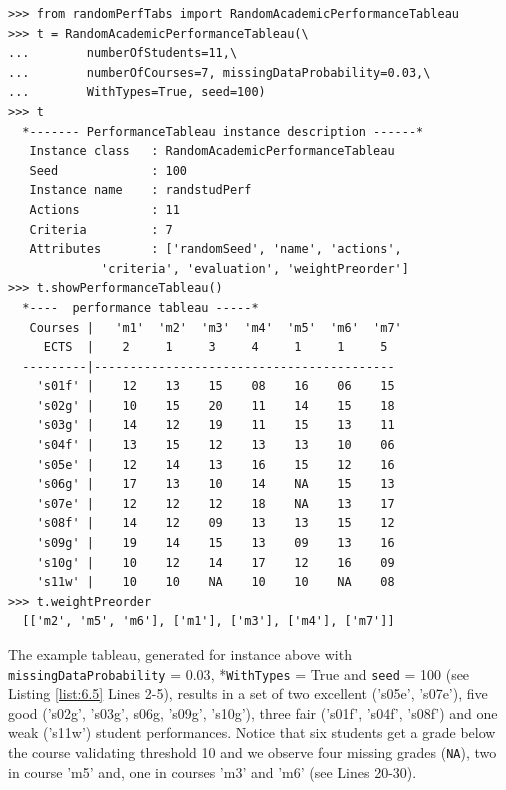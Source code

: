 \begin{lstlisting}[caption={Generating a random academic performance tableau},label=list:6.5]
>>> from randomPerfTabs import RandomAcademicPerformanceTableau
>>> t = RandomAcademicPerformanceTableau(\
...        numberOfStudents=11,\
...        numberOfCourses=7, missingDataProbability=0.03,\
...        WithTypes=True, seed=100)
>>> t
  *------- PerformanceTableau instance description ------*
   Instance class   : RandomAcademicPerformanceTableau
   Seed             : 100
   Instance name    : randstudPerf
   Actions          : 11
   Criteria         : 7
   Attributes       : ['randomSeed', 'name', 'actions',
             'criteria', 'evaluation', 'weightPreorder']
>>> t.showPerformanceTableau()
  *----  performance tableau -----*
   Courses |   'm1'  'm2'  'm3'  'm4'  'm5'  'm6'  'm7' 
     ECTS  |    2     1     3     4     1     1     5    
  ---------|------------------------------------------
    's01f' |    12    13    15    08    16    06    15   
    's02g' |    10    15    20    11    14    15    18   
    's03g' |    14    12    19    11    15    13    11   
    's04f' |    13    15    12    13    13    10    06   
    's05e' |    12    14    13    16    15    12    16   
    's06g' |    17    13    10    14    NA    15    13   
    's07e' |    12    12    12    18    NA    13    17   
    's08f' |    14    12    09    13    13    15    12   
    's09g' |    19    14    15    13    09    13    16   
    's10g' |    10    12    14    17    12    16    09   
    's11w' |    10    10    NA    10    10    NA    08
>>> t.weightPreorder
  [['m2', 'm5', 'm6'], ['m1'], ['m3'], ['m4'], ['m7']]
\end{lstlisting}
  
The example tableau, generated for instance above with \texttt{missingDataProbability} = $0.03$, *\texttt{WithTypes} = True and \texttt{seed} = 100 (see Listing \ref{list:6.5} Lines 2-5), results in a set of two excellent ('s05e', 's07e'), five good ('s02g', 's03g', s06g, 's09g', 's10g'), three fair ('s01f', 's04f', 's08f') and one weak ('s11w') student performances. Notice that six students get a grade below the course validating threshold 10 and we observe four missing grades (\texttt{NA}), two in course 'm5' and, one in courses 'm3' and 'm6' (see Lines 20-30).

